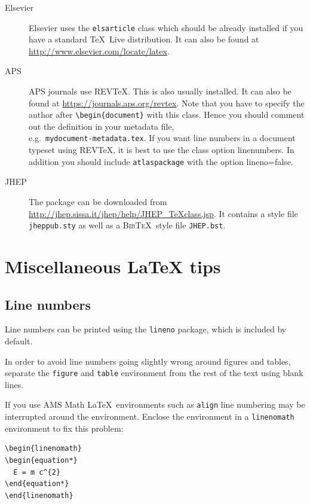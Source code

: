 \documentclass[atlasstyle,UKenglish]{latex/atlasdoc}
\newcommand{\BibTeX}{\textsc{Bib\TeX}}
\newcommand{\File}[1]{\texttt{#1}\xspace}
\newcommand{\Option}[1]{\textsf{#1}\xspace}
\newcommand{\Package}[1]{\texttt{#1}\xspace}
\begin{document}
\begin{description}
\item[Elsevier]Elsevier uses the \texttt{elsarticle} class which should be already installed if you have a standard 
  \TeX\ Live distribution. 
  It can also be found at \url{http://www.elsevier.com/locate/latex}.
  
\item[APS]APS journals use REV\TeX. This is also usually installed.
  It can also be found at \url{https://journals.aps.org/revtex}.
  Note that you have to specify the author after \verb|\begin{document}| with this class.
  Hence you should comment out the definition in your metadata file,\\
  e.g.\ \File{mydocument-metadata.tex}.
  If you want line numbers in a document typeset using REV\TeX, it is best to use the class option \Option{linenumbers}.
  In addition you should include \Package{atlaspackage} with the option \Option{lineno=false}.
  
\item[JHEP]The package can be downloaded from \url{http://jhep.sissa.it/jhep/help/JHEP_TeXclass.jsp}. It contains a style file \File{jheppub.sty} as well as a \BibTeX\ style file \File{JHEP.bst}. 
\end{description}


\section{Miscellaneous \LaTeX{} tips}
\label{sec:latex}

\subsection{Line numbers}

Line numbers can be printed using the \Package{lineno} package, 
which is included by default.

In order to avoid line numbers going slightly wrong around figures and tables,
separate the \Package{figure} and \Package{table} environment from the rest of the text using blank lines.

If you use AMS Math \LaTeX\ environments such as \Package{align} line numbering may be interrupted around the environment.
Enclose the environment in a \Package{linenomath} environment to fix this problem:
\begin{verbatim}
\begin{linenomath}
\begin{equation*}
  E = m c^{2}
\end{equation*}
\end{linenomath}
\end{verbatim}
\end{document}
